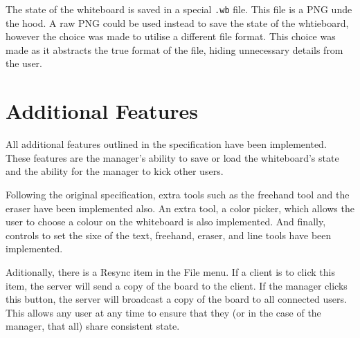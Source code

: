 \documentclass[12pt]{article}
\begin{document}
The state of the whiteboard is saved in a special \texttt{.wb} file. This file is a PNG unde the hood. A raw PNG could be used instead to save the state of the whtieboard, however the choice was made to utilise a different file format. This choice was made as it abstracts the true format of the file, hiding unnecessary details from the user.

\section{Additional Features}
All additional features outlined in the specification have been implemented. These features are the manager's ability to save or load the whiteboard's state and the ability for the manager to kick other users. 

Following the original specification, extra tools such as the freehand tool and the eraser have been implemented also. An extra tool, a color picker, which allows the user to choose a colour on the whiteboard is also implemented. And finally, controls to set the sixe of the text, freehand, eraser, and line tools have been implemented.

Aditionally, there is a Resync item in the File menu. If a client is to click this item, the server will send a copy of the board to the client. If the manager clicks this button, the server will broadcast a copy of the board to all connected users. This allows any user at any time to ensure that they (or in the case of the manager, that all) share consistent state.
\end{document}
